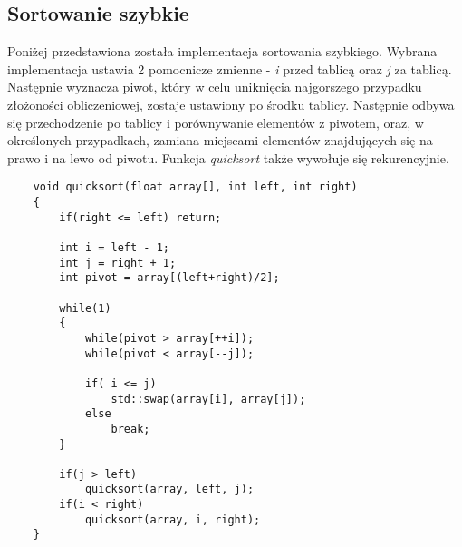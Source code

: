 \subsection{Sortowanie szybkie}
Poniżej przedstawiona została implementacja sortowania szybkiego. Wybrana implementacja ustawia 2 pomocnicze zmienne - \textit{i} przed tablicą oraz \textit{j} za tablicą. Następnie wyznacza piwot, który w celu uniknięcia najgorszego przypadku złożoności obliczeniowej, zostaje ustawiony po środku tablicy. Następnie odbywa się przechodzenie po tablicy i porównywanie elementów z piwotem, oraz, w określonych przypadkach, zamiana miejscami elementów znajdujących się na prawo i na lewo od piwotu. Funkcja \textit{quicksort} także wywołuje się rekurencyjnie.

\begin{lstlisting}
    void quicksort(float array[], int left, int right)
    {
	    if(right <= left) return;
    
	    int i = left - 1;
        int j = right + 1; 
        int pivot = array[(left+right)/2]; 
    
	    while(1)
        {
        	while(pivot > array[++i]);
	    	while(pivot < array[--j]);
    
	    	if( i <= j)
	    		std::swap(array[i], array[j]);
	    	else
	    		break;
	    }

	    if(j > left)
	        quicksort(array, left, j);
	    if(i < right)
	        quicksort(array, i, right);
    }
\end{lstlisting}







